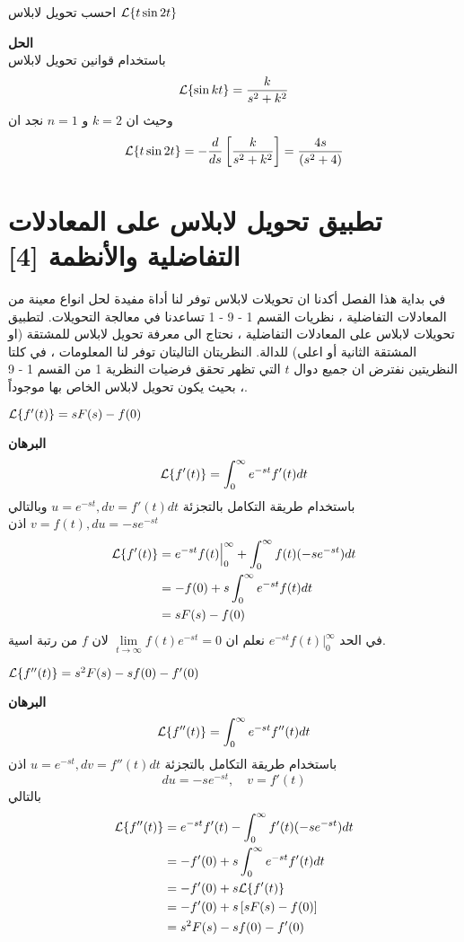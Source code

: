   \begin{example}
  	احسب تحويل لابلاس $\mathcal{L}\{t\sin 2t\}$
  \end{example}
  \noindent
  \textbf{الحل}\\
  \noindent
  باستخدام قوانين تحويل لابلاس
  \[
  \mathcal{L}\{\sin kt\} = \frac{k}{s^2 + k^2}
   \]
   وحيث ان $k=2$ و $n=1$ نجد ان
   \[
   \mathcal{L}\{t\sin 2t\} = -\frac{d}{ds}\left[\frac{k}{s^2 + k^2}\right] = \frac{4s}{(s^2 + 4)}
   \]
   \section[تطبيق تحويل لابلاس على المعادلات التفاضلية والانظمة]{ تطبيق تحويل لابلاس على المعادلات التفاضلية والأنظمة [4]}
   في بداية هذا الفصل أكدنا ان تحويلات لابلاس توفر لنا أداة مفيدة لحل انواع معينة من المعادلات التفاضلية ، نظريات القسم 1 - 9 - 1 تساعدنا في معالجة التحويلات. لتطبيق تحويلات لابلاس على المعادلات التفاضلية ، نحتاج الى معرفة تحويل لابلاس للمشتقة (او المشتقة الثانية أو اعلى) للدالة. النظريتان التاليتان توفر لنا المعلومات ، في كلتا النظريتين نفترض ان جميع دوال $t$ التي تظهر تحقق فرضيات النظرية 1 من القسم 1 - 9 ، بحيث يكون تحويل لابلاس الخاص بها موجوداً.
   
   \begin{theorem}[{[7]}]
   	$\mathcal{L}\{f'(t)\} = sF(s) - f(0)$
   \end{theorem}
   \noindent
   \textbf{البرهان}
   \[
   \mathcal{L}\{f'(t)\} = \int_{0}^{\infty} e^{-st} f'(t)dt
   \]
   باستخدام طريقة التكامل بالتجزئة $u=e^{-st} , dv = f'(t)dt$ وبالتالي
   $v=f(t), du = -se^{-st}$ اذن
   \begin{align*}
   	\mathcal{L}\{f'(t)\} &= e^{-st} f(t)\Big|^\infty_0 + \int_{0}^{\infty} f(t) (-se^{-st}) dt\\
   	&= -f(0) + s \int_{0}^{\infty} e^{-st} f(t) dt\\
   	&= sF(s) - f(0)
   \end{align*}
   في الحد 
   $e^{-st} f(t)\Big|^\infty_0 $
   نعلم ان 
   $\lim\limits_{t\to \infty} f(t) e^{-st} = 0$ لان $f$ من رتبة اسية.
   
   \begin{theorem}[{[7]}]
   	$\mathcal{L}\{f''(t)\} = s^2F(s) - sf(0) - f'(0)$ 
   \end{theorem}
   \noindent
   \textbf{البرهان}
   \[
   \mathcal{L}\{f''(t)\} = \int_{0}^{\infty} e^{-st} f''(t) dt
   \]
   باستخدام طريقة التكامل بالتجزئة 
   $u=e^{-st} , dv = f''(t) dt$ اذن
   \[
   du = -se^{-st}, \quad v= f'(t)
   \]
   بالتالي
   \begin{align*}
   	\mathcal{L}\{f''(t)\} &= e^{-st} f'(t) - \int_{0}^{\infty} f'(t) (-se^{-st} ) dt\\
   	&= -f'(0) + s \int_{0}^{\infty} e^{-st} f'(t)dt\\
   	&= -f'(0) + s\mathcal{L}\{f'(t)\}\\
   	&= -f'(0) + s \left[sF(s) - f(0)\right]\\
   	&= s^2F(s) - sf(0) - f'(0)
    \end{align*}
    
